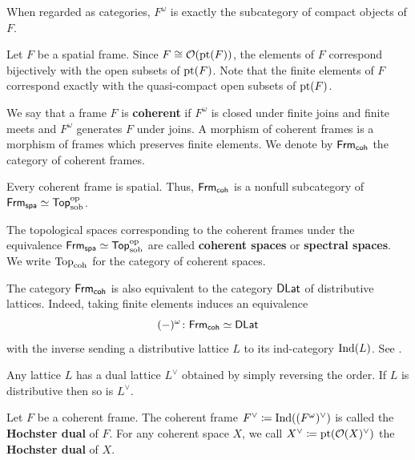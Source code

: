 \documentclass[10pt,a4paper,oneside]{article}
\begin{document}
\begin{rem}
When regarded as categories, $F^{\omega}$ is exactly the subcategory of compact objects of $F$.
\end{rem}

\begin{rem}\label{rem:stone-duality}
Let $F$ be a spatial frame. Since $F\cong\mathcal O(\operatorname{pt}(F))$, the elements of $F$  correspond bijectively with the open subsets of $\operatorname{pt}(F)$. Note that the finite elements of $F$ correspond exactly with the quasi-compact open subsets of $\operatorname{pt}(F)$.
\end{rem}

\begin{de}
We say that a frame $F$ is \textbf{coherent} if $F^{\omega}$ is closed under finite joins and finite meets and $F^{\omega}$ generates $F$ under joins. A morphism of coherent frames is a morphism of frames which preserves finite elements. We denote by $\mathsf{Frm}_{\mathsf{coh}}$ the category of coherent frames.
\end{de}



\begin{rem}
Every coherent frame is spatial. Thus, $\mathsf{Frm}_{\mathsf{coh}}$ is a nonfull subcategory of $\mathsf{Frm}_{\mathsf{spa}} \simeq \mathsf{Top}^{\operatorname{op}}_{\operatorname{sob}}$.
\end{rem}

\begin{de}
The topological spaces corresponding to the coherent frames under the equivalence $\mathsf{Frm}_{\mathsf{spa}} \simeq \mathsf{Top}^{\operatorname{op}}_{\operatorname{sob}}$ are called \textbf{coherent spaces} or \textbf{spectral spaces}. We write $\operatorname{Top}_{\operatorname{coh}}$ for the category of coherent spaces.
\end{de}

\begin{rem}
The category $\mathsf{Frm}_{\mathsf{coh}}$ is also equivalent to the category $\mathsf{DLat}$ of distributive lattices. Indeed, taking finite elements induces an equivalence
\[
(-)^{\omega}\colon \mathsf{Frm}_{\mathsf{coh}} \simeq \mathsf{DLat}
\]
with the inverse sending a distributive lattice $L$ to its ind-category $\operatorname{Ind}(L)$. See \cite[Proposition~II.3.2]{Johnstone82}.
\end{rem}

\begin{rem}
Any lattice $L$ has a dual lattice $L^{\vee}$ obtained by simply reversing the order. If $L$ is distributive then so is $L^{\vee}$.
\end{rem}

\begin{de}
Let $F$ be a coherent frame. The coherent frame $F^{\vee}\coloneqq\operatorname{Ind}((F^{\omega})^\vee)$ is called the \textbf{Hochster dual} of $F$. For any coherent space $X$, we call $X^\vee\coloneqq \operatorname{pt}(\mathcal O(X)^{\vee})$ the \textbf{Hochster dual} of $X$.
\end{de}
\end{document}
